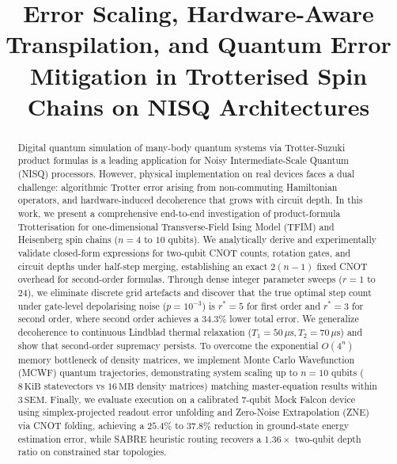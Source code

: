 \documentclass[conference]{IEEEtran}
\begin{document}
\title{Error Scaling, Hardware-Aware Transpilation, and Quantum Error Mitigation in Trotterised Spin Chains on NISQ Architectures}

\author{
}

\maketitle

\begin{abstract}
Digital quantum simulation of many-body quantum systems via Trotter-Suzuki product formulas is a leading application for Noisy Intermediate-Scale Quantum (NISQ) processors. However, physical implementation on real devices faces a dual challenge: algorithmic Trotter error arising from non-commuting Hamiltonian operators, and hardware-induced decoherence that grows with circuit depth. In this work, we present a comprehensive end-to-end investigation of product-formula Trotterisation for one-dimensional Transverse-Field Ising Model (TFIM) and Heisenberg spin chains ($n = 4$ to $10$ qubits). We analytically derive and experimentally validate closed-form expressions for two-qubit CNOT counts, rotation gates, and circuit depths under half-step merging, establishing an exact $2(n-1)$ fixed CNOT overhead for second-order formulas. Through dense integer parameter sweeps ($r = 1$ to $24$), we eliminate discrete grid artefacts and discover that the true optimal step count under gate-level depolarising noise ($p = 10^{-3}$) is $r^* = 5$ for first order and $r^* = 3$ for second order, where second order achieves a $34.3\%$ lower total error. We generalize decoherence to continuous Lindblad thermal relaxation ($T_1 = 50\,\mu\text{s}, T_2 = 70\,\mu\text{s}$) and show that second-order supremacy persists. To overcome the exponential $O(4^n)$ memory bottleneck of density matrices, we implement Monte Carlo Wavefunction (MCWF) quantum trajectories, demonstrating system scaling up to $n = 10$ qubits ($8\,\text{KiB}$ statevectors vs $16\,\text{MB}$ density matrices) matching master-equation results within $3\,\text{SEM}$. Finally, we evaluate execution on a calibrated 7-qubit Mock Falcon device using simplex-projected readout error unfolding and Zero-Noise Extrapolation (ZNE) via CNOT folding, achieving a $25.4\%$ to $37.8\%$ reduction in ground-state energy estimation error, while SABRE heuristic routing recovers a $1.36\times$ two-qubit depth ratio on constrained star topologies.
\end{abstract}
\end{document}

